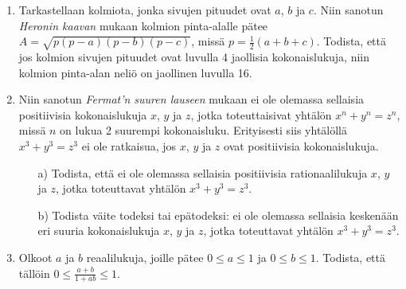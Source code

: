 \begin{enumerate}
\item Tarkastellaan kolmiota, jonka sivujen pituudet ovat
$a$, $b$ ja $c$. Niin sanotun {\em Heronin kaavan} mukaan
kolmion pinta-alalle pätee $A = \sqrt{p(p-a)(p-b)(p-c)}$,
missä $p = \frac{1}{2}(a+b+c)$. Todista, että jos kolmion
sivujen pituudet ovat luvulla 4 jaollisia kokonaislukuja,
niin kolmion pinta-alan neliö on jaollinen luvulla 16.

\item
Niin sanotun {\em Fermat'n suuren lauseen} mukaan ei ole
olemassa sellaisia positiivisia kokonaislukuja $x$, $y$
ja $z$, jotka toteuttaisivat yhtälön $x^{n} + y^{n} = z^{n}$, missä $n$ on lukua 2 suurempi kokonaisluku.
Erityisesti siis yhtälöllä $x^{3} + y^{3} = z^{3}$ ei
ole ratkaisua, jos $x$, $y$ ja $z$ ovat positiivisia
kokonaislukuja.
\begin{itemize}
\item[a)] Todista, että ei ole olemassa sellaisia
positiivisia rationaalilukuja $x$, $y$ ja $z$, jotka
toteuttavat yhtälön $x^{3} + y^{3} = z^{3}$.
\item[b)] Todista väite todeksi tai epätodeksi: ei ole
olemassa sellaisia keskenään eri suuria kokonaislukuja
$x$, $y$ ja $z$, jotka toteuttavat yhtälön $x^{3} + y^{3} = z^{3}$.
\end{itemize}

\item Olkoot $a$ ja $b$ reaalilukuja, joille pätee $0 \le a \le 1$ ja $0 \le b \le 1$. Todista, että tällöin $0 \le \frac{a + b}{1 + ab} \le 1$.

\end{enumerate}
